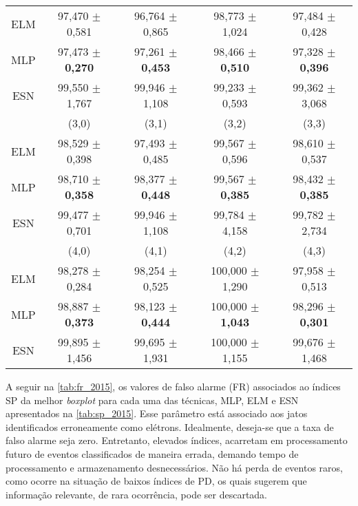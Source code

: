 \begin{table}[H]
\begin{footnotesize}
\begin{tabular}{c*{4}c}
			ELM & 97,470 $\pm$ 0,581 & 96,764 $\pm$ 0,865 &  98,773 $\pm$ 1,024 & 97,484 $\pm$ 0,428  \\
			MLP & 97,473 $\pm$ \textbf{0,270} & 97,261 $\pm$ \textbf{0,453} &  98,466 $\pm$ \textbf{0,510} & 97,328 $\pm$ \textbf{0,396}  \\
			ESN & 99,550 $\pm$ 1,767 & 99,946 $\pm$ 1,108 &  99,233 $\pm$ 0,593 & 99,362 $\pm$ 3,068  \\\midrule \midrule
			    &        (3,0)       &        (3,1)       &         (3,2)       &       (3,3)        \\ \cmidrule(lr){2-2}\cmidrule(lr){3-3}\cmidrule(lr){4-4}\cmidrule(lr){5-5}                 
			ELM & 98,529 $\pm$ 0,398 & 97,493 $\pm$ 0,485 &  99,567 $\pm$ 0,596 & 98,610 $\pm$ 0,537  \\
			MLP & 98,710 $\pm$ \textbf{0,358} & 98,377 $\pm$ \textbf{0,448} &  99,567 $\pm$ \textbf{0,385} & 98,432 $\pm$ \textbf{0,385}  \\
			ESN & 99,477 $\pm$ 0,701 & 99,946 $\pm$ 1,108 &  99,784 $\pm$ 4,158 & 99,782 $\pm$ 2,734  \\\midrule \midrule
		  	    &        (4,0)       &        (4,1)       & \cellcolor{gray!15}(4,2)        &       (4,3)        \\ \cmidrule(lr){2-2}\cmidrule(lr){3-3}\cmidrule(lr){4-4}\cmidrule(lr){5-5}                 
			ELM & 98,278 $\pm$ 0,284 & 98,254 $\pm$ 0,525 & 100,000 $\pm$ 1,290 & 97,958 $\pm$ 0,513 \\
			MLP & 98,887 $\pm$ \textbf{0,373} & 98,123 $\pm$ \textbf{0,444} & 100,000 $\pm$ \textbf{1,043} & 98,296 $\pm$ \textbf{0,301} \\
			ESN & 99,895 $\pm$ 1,456 & 99,695 $\pm$ 1,931 & 100,000 $\pm$ 1,155 & 99,676 $\pm$ 1,468 \\\bottomrule
		\end{tabular}%
	\end{footnotesize}
\end{table}%


A seguir na \autoref{tab:fr_2015}, os valores de falso alarme (FR) associados ao índices SP da melhor \textit{boxplot} para cada uma das técnicas, MLP, ELM e ESN apresentados na \autoref{tab:sp_2015}. Esse parâmetro está associado aos jatos identificados erroneamente como elétrons. Idealmente, deseja-se que a taxa de falso alarme seja zero. Entretanto, elevados índices, acarretam em processamento futuro de eventos classificados de maneira errada, demando tempo de processamento e armazenamento desnecessários. Não há perda de eventos raros, como ocorre na situação de baixos índices de PD, os quais sugerem que informação relevante, de rara ocorrência, pode ser descartada.

